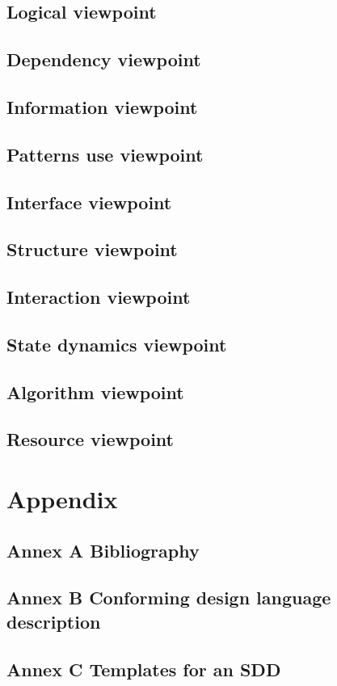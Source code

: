 \documentclass[compsoc,draftclsnofoot,onecolumn,10pt]{IEEEtran}
\begin{document}
\subsection{Logical viewpoint} 
\subsection{Dependency viewpoint} 
\subsection{Information viewpoint} 
\subsection{Patterns use viewpoint} 
\subsection{Interface viewpoint} 
\subsection{Structure viewpoint} 
\subsection{Interaction viewpoint} 
\subsection{State dynamics viewpoint} 
\subsection{Algorithm viewpoint} 
\subsection{Resource viewpoint}

\section{Appendix}
\subsection{Annex A  Bibliography} 
\subsection{Annex B  Conforming design language description} 
\subsection{Annex C Templates for an SDD}
\end{document}
